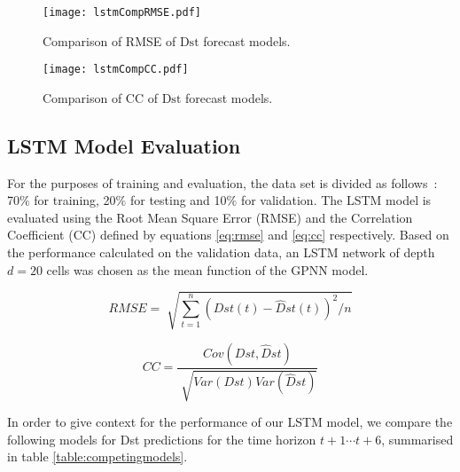 \begin{figure}
	\texttt{[image: lstmCompRMSE.pdf]}
	\caption{Comparison of RMSE of $\text{Dst}$ forecast models.}
	\label{fig:lstmRMSE}
\end{figure}

\begin{figure}
	\texttt{[image: lstmCompCC.pdf]}
	\caption{Comparison of CC of $\text{Dst}$ forecast models.}
	\label{fig:lstmCC}
\end{figure}

\subsection{LSTM Model Evaluation}

For the purposes of training and evaluation, the data set is divided as follows : 70$\%$ for training, 20$\%$  
for testing and 10$\%$ for validation. The LSTM model is evaluated using the Root Mean Square Error (RMSE) 
and the Correlation Coefficient (CC) defined by equations \ref{eq:rmse} and \ref{eq:cc} respectively. Based 
on the performance calculated on the validation data, an LSTM network of depth $d = 20$ cells was chosen as 
the mean function of the GPNN model.


\begin{equation}\label{eq:rmse}
 RMSE = \sqrt[]{ \sum_{t=1}^{n} \left( Dst \left( t \right) - \hat{D}st \left( t \right)  \right) ^{2}/n}
\end{equation}

\begin{equation}\label{eq:cc}
 CC = \frac{Cov \left( Dst, \hat{D}st \right)}{\sqrt[]{Var \left( Dst \right) Var \left( \hat{D}st \right)}} 
\end{equation}


In order to give context for the performance of our LSTM model, we compare the following models for Dst predictions 
for the time horizon $t+1 \cdots t+6$, summarised in table \ref{table:competingmodels}.

